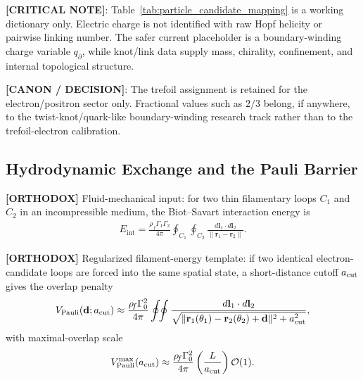 \documentclass[11pt]{article}
\theoremstyle{definition}
\theoremstyle{plain}
\theoremstyle{remark}
\begin{document}
        \textbf{[CRITICAL NOTE]}: Table~\ref{tab:particle_candidate_mapping} is a working dictionary only. Electric charge is not identified with raw Hopf helicity or pairwise linking number. The safer current placeholder is a boundary-winding charge variable $q_{\partial}$, while knot/link data supply mass, chirality, confinement, and internal topological structure.

        \textbf{[CANON / DECISION]}: The trefoil assignment is retained for the electron/positron sector only. Fractional values such as $2/3$ belong, if anywhere, to the twist-knot/quark-like boundary-winding research track rather than to the trefoil-electron calibration.

    \subsection{Hydrodynamic Exchange and the Pauli Barrier}
        \label{subsec:integration_pauli}

        \textbf{[ORTHODOX]} Fluid-mechanical input: for two thin filamentary loops \(C_1\) and \(C_2\) in an
        incompressible medium, the Biot--Savart interaction energy is \cite{Batchelor1967}
        \begin{align}
            E_{\mathrm{int}}
            =
            \frac{\rho_{\!f}\Gamma_1\Gamma_2}{4\pi}
            \oint_{C_1}\oint_{C_2}
            \frac{d\mathbf{l}_1\cdot d\mathbf{l}_2}
            {\lVert \mathbf{r}_1 - \mathbf{r}_2 \rVert}.
            \label{eq:biot_savart_interaction}
        \end{align}

        \textbf{[ORTHODOX]} Regularized filament-energy template: if two identical electron-candidate loops are forced into the same spatial state, a short-distance cutoff \(a_{\rm cut}\) gives the overlap penalty
        \begin{align}
            V_{\mathrm{Pauli}}(\mathbf{d};a_{\rm cut})
            \approx
            \frac{\rho_{\!f}\Gamma_0^2}{4\pi}
            \oint\!\!\oint
            \frac{d\mathbf{l}_1\cdot d\mathbf{l}_2}
            {\sqrt{\lVert \mathbf{r}_1(\theta_1)-\mathbf{r}_2(\theta_2)+\mathbf{d}\rVert^2+a_{\rm cut}^2}},
            \label{eq:pauli_barrier_regularized}
        \end{align}
        with maximal-overlap scale
        \begin{align}
            V_{\mathrm{Pauli}}^{\max}(a_{\rm cut})
            \approx
            \frac{\rho_{\!f}\Gamma_0^2}{4\pi}\left(\frac{L}{a_{\rm cut}}\right)\mathcal{O}(1).
            \label{eq:pauli_barrier_scale}
        \end{align}
\end{document}
